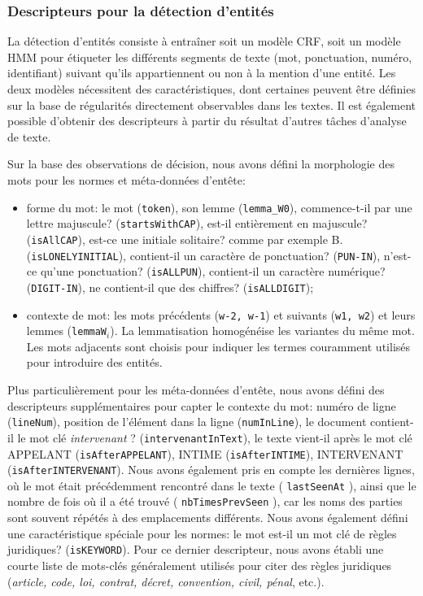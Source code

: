 \subsubsection{Descripteurs pour la détection d'entités}

La détection d'entités consiste à entraîner soit un modèle CRF, soit un modèle HMM pour étiqueter les différents segments de texte (mot, ponctuation, numéro, identifiant) suivant qu'ils appartiennent ou non à la mention d'une entité. Les deux modèles nécessitent des caractéristiques, dont certaines peuvent être définies sur la base de régularités directement observables dans les textes. Il est également possible d'obtenir des descripteurs à partir du résultat d'autres tâches d'analyse de texte.

Sur la base des observations de décision, nous avons défini la morphologie des mots pour les normes et méta-données d'entête:
\begin{itemize}
	\item forme du mot: le mot (\verb|token|), son lemme (\verb|lemma_W0|), \og commence-t-il par une lettre majuscule? \fg{} (\verb|startsWithCAP|), \og est-il entièrement en majuscule? \fg{} (\verb|isAllCAP|), \og est-ce une initiale solitaire? \fg{} comme par exemple \og B. \fg{} (\verb|isLONELYINITIAL|), \og contient-il un caractère de ponctuation? \fg{} (\verb|PUN-IN|), \og n'est-ce qu'une ponctuation? \fg{} (\verb|isALLPUN|), \og contient-il un caractère numérique? \fg{} (\verb|DIGIT-IN|),  \og ne contient-il que 
	des chiffres? \fg{} (\verb|isALLDIGIT|);
	\item contexte de mot: les mots précédents (\verb|w-2, w-1|) et suivants (\verb|w1, w2|) et leurs lemmes (\verb|lemmaW|$_i$). La lemmatisation homogénéise les variantes du même mot. Les mots adjacents sont choisis pour indiquer les termes couramment utilisés pour introduire des entités.
\end{itemize}

Plus particulièrement pour les méta-données d'entête, nous avons défini des descripteurs supplémentaires pour capter le contexte du mot: numéro de ligne (\verb|lineNum|), position de l'élément dans la ligne (\verb|numInLine|), \og le document contient-il le mot clé \textit{intervenant} ? \fg{} (\verb|intervenantInText|), le texte vient-il après le mot clé \og APPELANT \fg{} (\verb|isAfterAPPELANT|), \og INTIME \fg{} (\verb|isAfterINTIME|), \og INTERVENANT \fg{} (\verb|isAfterINTERVENANT|). Nous avons également pris en compte les dernières lignes, où le mot était précédemment rencontré dans le texte ( \verb|lastSeenAt| ), ainsi que le nombre de fois où il a été trouvé ( \verb|nbTimesPrevSeen| ), car les noms des parties sont souvent répétés à des emplacements différents. Nous avons également défini une caractéristique spéciale pour les normes: \og le mot est-il un mot clé de règles juridiques? \fg{} (\verb|isKEYWORD|). Pour ce dernier descripteur, nous avons établi une courte liste de mots-clés généralement utilisés pour citer des règles juridiques (\textit{article, code, loi, contrat, décret, convention, civil, pénal}, etc.).

